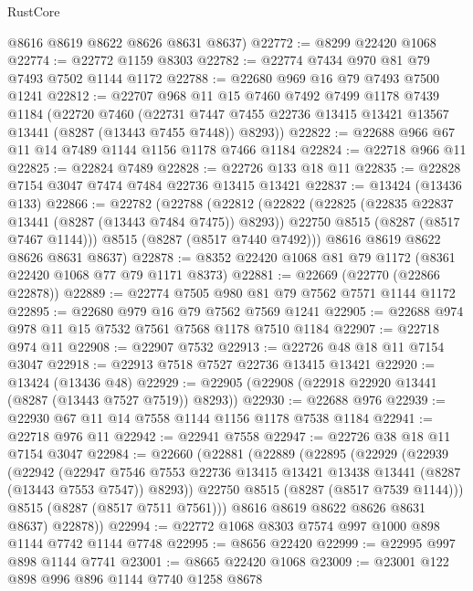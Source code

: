 \begin{lexlean}{RustCore}
\begin{coremodule}
      @8616
      @8619
      @8622
      @8626
      @8631
      @8637)
@22772 := @8299 @22420 @1068
@22774 := @22772 @1159 @8303
@22782 := @22774 @7434 @970 @81 @79 @7493 @7502 @1144 @1172
@22788 := @22680 @969 @16 @79 @7493 @7500 @1241
@22812 := @22707
    @968
    @11
    @15
    @7460
    @7492
    @7499
    @1178
    @7439
    @1184
    (@22720
      @7460
      (@22731 @7447 @7455 @22736 @13415 @13421 @13567 @13441 (@8287 (@13443 @7455 @7448)) @8293))
@22822 := @22688 @966 @67 @11 @14 @7489 @1144 @1156 @1178 @7466 @1184
@22824 := @22718 @966 @11
@22825 := @22824 @7489
@22828 := @22726 @133 @18 @11
@22835 := @22828 @7154 @3047 @7474 @7484 @22736 @13415 @13421
@22837 := @13424 (@13436 @133)
@22866 := @22782
    (@22788
      (@22812
        (@22822
          (@22825 (@22835 @22837 @13441 (@8287 (@13443 @7484 @7475)) @8293))
          @22750
          @8515
          (@8287 (@8517 @7467 @1144)))
        @8515
        (@8287 (@8517 @7440 @7492)))
      @8616
      @8619
      @8622
      @8626
      @8631
      @8637)
@22878 := @8352 @22420 @1068 @81 @79 @1172 (@8361 @22420 @1068 @77 @79 @1171 @8373)
@22881 := @22669 (@22770 (@22866 @22878))
@22889 := @22774 @7505 @980 @81 @79 @7562 @7571 @1144 @1172
@22895 := @22680 @979 @16 @79 @7562 @7569 @1241
@22905 := @22688 @974 @978 @11 @15 @7532 @7561 @7568 @1178 @7510 @1184
@22907 := @22718 @974 @11
@22908 := @22907 @7532
@22913 := @22726 @48 @18 @11 @7154 @3047
@22918 := @22913 @7518 @7527 @22736 @13415 @13421
@22920 := @13424 (@13436 @48)
@22929 := @22905 (@22908 (@22918 @22920 @13441 (@8287 (@13443 @7527 @7519)) @8293))
@22930 := @22688 @976
@22939 := @22930 @67 @11 @14 @7558 @1144 @1156 @1178 @7538 @1184
@22941 := @22718 @976 @11
@22942 := @22941 @7558
@22947 := @22726 @38 @18 @11 @7154 @3047
@22984 := @22660
    (@22881
      (@22889
        (@22895
          (@22929
            (@22939
              (@22942
                (@22947
                  @7546
                  @7553
                  @22736
                  @13415
                  @13421
                  @13438
                  @13441
                  (@8287 (@13443 @7553 @7547))
                  @8293))
              @22750
              @8515
              (@8287 (@8517 @7539 @1144)))
            @8515
            (@8287 (@8517 @7511 @7561)))
          @8616
          @8619
          @8622
          @8626
          @8631
          @8637)
        @22878))
@22994 := @22772 @1068 @8303 @7574 @997 @1000 @898 @1144 @7742 @1144 @7748
@22995 := @8656 @22420
@22999 := @22995 @997 @898 @1144 @7741
@23001 := @8665 @22420 @1068
@23009 := @23001 @122 @898 @996 @896 @1144 @7740 @1258 @8678

\end{coremodule}
\end{lexlean}
